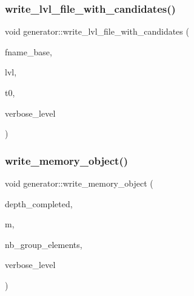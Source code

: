 \mbox{\label{classgenerator_af3de7a4ba5e1075faa23d47d4c31ca55}} 
\subsubsection{\texorpdfstring{write\+\_\+lvl\+\_\+file\+\_\+with\+\_\+candidates()}{write\_lvl\_file\_with\_candidates()}}
{\footnotesize\ttfamily void generator\+::write\+\_\+lvl\+\_\+file\+\_\+with\+\_\+candidates (\begin{DoxyParamCaption}\item[{\mbox{\hyperlink{galois_8h_ab6cc7b4aeb6ea31aba2b3fbfc83ff5e6}{B\+Y\+TE}} $\ast$}]{fname\+\_\+base,  }\item[{\mbox{\hyperlink{galois_8h_a09fddde158a3a20bd2dcadb609de11dc}{I\+NT}}}]{lvl,  }\item[{\mbox{\hyperlink{galois_8h_a09fddde158a3a20bd2dcadb609de11dc}{I\+NT}}}]{t0,  }\item[{\mbox{\hyperlink{galois_8h_a09fddde158a3a20bd2dcadb609de11dc}{I\+NT}}}]{verbose\+\_\+level }\end{DoxyParamCaption})}

\mbox{\label{classgenerator_a87d8bc9409d40e0269391bdc9ca3488c}} 
\subsubsection{\texorpdfstring{write\+\_\+memory\+\_\+object()}{write\_memory\_object()}}
{\footnotesize\ttfamily void generator\+::write\+\_\+memory\+\_\+object (\begin{DoxyParamCaption}\item[{\mbox{\hyperlink{galois_8h_a09fddde158a3a20bd2dcadb609de11dc}{I\+NT}}}]{depth\+\_\+completed,  }\item[{\mbox{\hyperlink{classmemory__object}{memory\+\_\+object}} $\ast$}]{m,  }\item[{\mbox{\hyperlink{galois_8h_a09fddde158a3a20bd2dcadb609de11dc}{I\+NT}} \&}]{nb\+\_\+group\+\_\+elements,  }\item[{\mbox{\hyperlink{galois_8h_a09fddde158a3a20bd2dcadb609de11dc}{I\+NT}}}]{verbose\+\_\+level }\end{DoxyParamCaption})}

